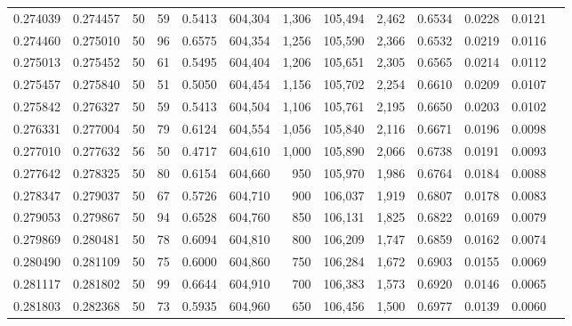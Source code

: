 \begin{tabular}{rrrrrrrrrrrrr}
0.274039 & 0.274457 &    50 &  59 &                                     0.5413 & 604,304 &   1,306 & 105,494 &   2,462 & 0.6534 & 0.0228 & 0.0121 \\
0.274460 & 0.275010 &    50 &  96 &                                     0.6575 & 604,354 &   1,256 & 105,590 &   2,366 & 0.6532 & 0.0219 & 0.0116 \\
0.275013 & 0.275452 &    50 &  61 &                                     0.5495 & 604,404 &   1,206 & 105,651 &   2,305 & 0.6565 & 0.0214 & 0.0112 \\
0.275457 & 0.275840 &    50 &  51 &                                     0.5050 & 604,454 &   1,156 & 105,702 &   2,254 & 0.6610 & 0.0209 & 0.0107 \\
0.275842 & 0.276327 &    50 &  59 &                                     0.5413 & 604,504 &   1,106 & 105,761 &   2,195 & 0.6650 & 0.0203 & 0.0102 \\
0.276331 & 0.277004 &    50 &  79 &                                     0.6124 & 604,554 &   1,056 & 105,840 &   2,116 & 0.6671 & 0.0196 & 0.0098 \\
0.277010 & 0.277632 &    56 &  50 &                                     0.4717 & 604,610 &   1,000 & 105,890 &   2,066 & 0.6738 & 0.0191 & 0.0093 \\
0.277642 & 0.278325 &    50 &  80 &                                     0.6154 & 604,660 &     950 & 105,970 &   1,986 & 0.6764 & 0.0184 & 0.0088 \\
0.278347 & 0.279037 &    50 &  67 &                                     0.5726 & 604,710 &     900 & 106,037 &   1,919 & 0.6807 & 0.0178 & 0.0083 \\
0.279053 & 0.279867 &    50 &  94 &                                     0.6528 & 604,760 &     850 & 106,131 &   1,825 & 0.6822 & 0.0169 & 0.0079 \\
0.279869 & 0.280481 &    50 &  78 &                                     0.6094 & 604,810 &     800 & 106,209 &   1,747 & 0.6859 & 0.0162 & 0.0074 \\
0.280490 & 0.281109 &    50 &  75 &                                     0.6000 & 604,860 &     750 & 106,284 &   1,672 & 0.6903 & 0.0155 & 0.0069 \\
0.281117 & 0.281802 &    50 &  99 &                                     0.6644 & 604,910 &     700 & 106,383 &   1,573 & 0.6920 & 0.0146 & 0.0065 \\
0.281803 & 0.282368 &    50 &  73 &                                     0.5935 & 604,960 &     650 & 106,456 &   1,500 & 0.6977 & 0.0139 & 0.0060 \\

\end{tabular}
